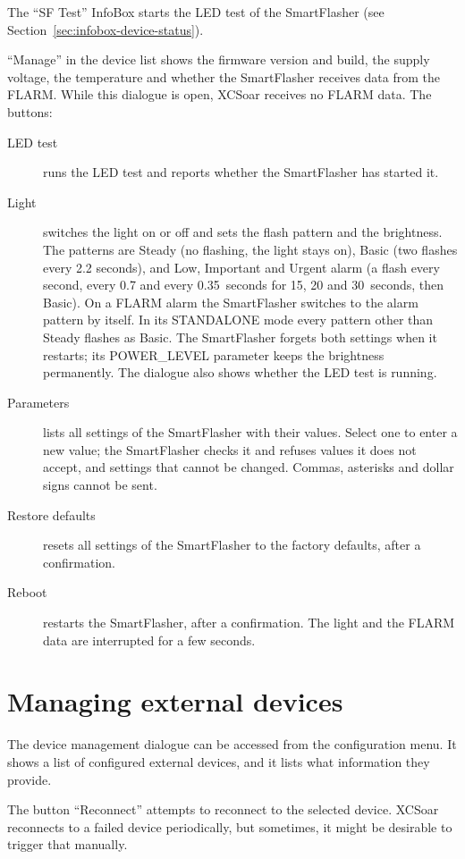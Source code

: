 The ``SF Test'' InfoBox starts the LED test of the SmartFlasher (see
Section~\ref{sec:infobox-device-status}).

``Manage'' in the device list shows the firmware version and build, the
supply voltage, the temperature and whether the SmartFlasher receives
data from the FLARM.  While this dialogue is open, XCSoar receives no
FLARM data.  The buttons:
\begin{description}
\item[LED test] runs the LED test and reports whether the SmartFlasher
  has started it.
\item[Light] switches the light on or off and sets the flash pattern and
  the brightness.  The patterns are Steady (no flashing, the light
  stays on), Basic (two flashes every 2.2 seconds), and Low, Important
  and Urgent alarm (a flash every second, every 0.7 and every
  0.35~seconds for 15, 20 and 30~seconds, then Basic).  On a FLARM
  alarm the SmartFlasher switches to the alarm pattern by itself.  In
  its STANDALONE mode every pattern other than Steady flashes as Basic.
  The SmartFlasher forgets both settings when it restarts; its
  POWER\_LEVEL parameter keeps the brightness permanently.  The dialogue
  also shows whether the LED test is running.
\item[Parameters] lists all settings of the SmartFlasher with their
  values.  Select one to enter a new value; the SmartFlasher checks it
  and refuses values it does not accept, and settings that cannot be
  changed.  Commas, asterisks and dollar signs cannot be sent.
\item[Restore defaults] resets all settings of the SmartFlasher to the
  factory defaults, after a confirmation.
\item[Reboot] restarts the SmartFlasher, after a confirmation.  The light
  and the FLARM data are interrupted for a few seconds.
\end{description}


\section{Managing external devices}

The device management dialogue can be accessed from the configuration
menu. It shows a list of configured external devices,
and it lists what information they provide.

The button ``Reconnect'' attempts to reconnect to the selected
device.  XCSoar reconnects to a failed device periodically, but
sometimes, it might be desirable to trigger that manually.


